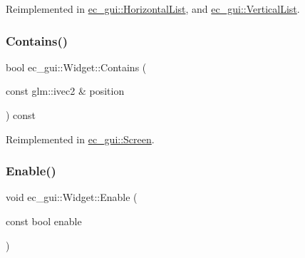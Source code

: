 Reimplemented in \mbox{\hyperlink{classec__gui_1_1_horizontal_list_abf74f325e380e8b26aeac0018995312c}{ec\+\_\+gui\+::\+Horizontal\+List}}, and \mbox{\hyperlink{classec__gui_1_1_vertical_list_a3333415b5bef7e007bc5f62126efa620}{ec\+\_\+gui\+::\+Vertical\+List}}.

\mbox{\label{classec__gui_1_1_widget_a61c3184d7fddb724bcf4a956a3f0e662}} 
\subsubsection{\texorpdfstring{Contains()}{Contains()}}
{\footnotesize\ttfamily bool ec\+\_\+gui\+::\+Widget\+::\+Contains (\begin{DoxyParamCaption}\item[{const glm\+::ivec2 \&}]{position }\end{DoxyParamCaption}) const\hspace{0.3cm}{\ttfamily [virtual]}}



Reimplemented in \mbox{\hyperlink{classec__gui_1_1_screen_a99d3e8673ceedf958fd36c470575be65}{ec\+\_\+gui\+::\+Screen}}.

\mbox{\label{classec__gui_1_1_widget_ab75853fb9f30f9c4045a353098c75272}} 
\subsubsection{\texorpdfstring{Enable()}{Enable()}}
{\footnotesize\ttfamily void ec\+\_\+gui\+::\+Widget\+::\+Enable (\begin{DoxyParamCaption}\item[{const bool}]{enable }\end{DoxyParamCaption})\hspace{0.3cm}{\ttfamily [virtual]}}

\mbox{\label{classec__gui_1_1_widget_ae001f8e501302223bacc08ece749d83e}} 
